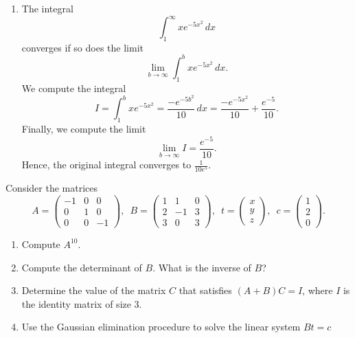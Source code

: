 \documentclass[11.0pt]{exam}
\begin{document}
\begin{questions}
\begin{solution}[0cm]
\begin{enumerate}
\[
\frac{x + 1}{(x + 3)(x - 2)}=\frac{A}{x + 3} + \frac{B}{x - 2}=\frac{A(x-2)+B(x+3)}{(x + 3)(x - 2)}=\frac{Ax-2A+Bx+3B}{(x + 3)(x - 2)}
\]
and hence we have
\[
\begin{aligned}
A+B&=1\\
-2A+3B&=1
\end{aligned}
\]
which gives us $A=\frac{2}{5}, B=-\frac{2}{5}$. Hence, the integral is
\[I=\int \frac{\frac{2}{5}}{x+3}+\frac{-\frac{3}{5}}{x-2}\, dx = \frac{2}{5}\ln(x+3)-\frac{2}{5}\ln(x-2)+C.\]

\item The integral \[
\int_1^{\infty} xe^{-5x^2} \, dx
\]
converges if so does the limit
\[\lim_{b\rightarrow\infty}\int_1^b xe^{-5x^2} \,dx.\]
We compute the integral 
\[I=\int_1^b xe^{-5x^2}=\frac{-e^{-5b^2}}{10}\, dx= \frac{-e^{-5x^2}}{10}+\frac{e^{-5}}{10}.\]
Finally, we compute the limit
\[\lim_{b\rightarrow\infty} I=\frac{e^{-5}}{10}.\]
Hence, the original integral converges to $\displaystyle \frac{1}{10e^5}$.
\end{enumerate}
\end{solution}
\question[4] Consider the matrices
\begin{equation*}
A=\begin{pmatrix}
-1 & 0 & 0\\
0 & 1 & 0\\
0 & 0 & -1
\end{pmatrix},
\enspace
B=\begin{pmatrix}
1 & 1 & 0\\
2 & -1 & 3\\
3 & 0 & 3
\end{pmatrix},
\enspace
t=\begin{pmatrix}
x\\
y\\
z
\end{pmatrix},
\enspace
c=\begin{pmatrix}
1\\
2\\
0
\end{pmatrix}.
\end{equation*}
\begin{enumerate}
\item Compute $A^{10}$.
\item Compute the determinant of $B$. What is the inverse of $B$?
\item Determine the value of the matrix $C$ that satisfies $(A+B)C=I$, where $I$ is the identity matrix of size 3.
\item Use the Gaussian elimination procedure to solve the linear system $Bt=c$
\end{enumerate}


\end{questions}
\end{document}
